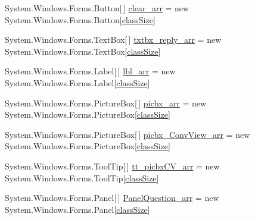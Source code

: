 \begin{DoxyCompactItemize}
\item 
\-System.\-Windows.\-Forms.\-Button\mbox{[}$\,$\mbox{]} \hyperlink{class_sr_p___classroom_inq_1_1frm_classrrom_inq_a1c427c3d5bb61c96ca798e5f6aaff8f4}{clear\-\_\-arr} = new \-System.\-Windows.\-Forms.\-Button\mbox{[}\hyperlink{class_sr_p___classroom_inq_1_1frm_classrrom_inq_a78d9aab335edfe53d39036b9d89928a8}{class\-Size}\mbox{]}
\item 
\-System.\-Windows.\-Forms.\-Text\-Box\mbox{[}$\,$\mbox{]} \hyperlink{class_sr_p___classroom_inq_1_1frm_classrrom_inq_a3411157caafbe33c31a364fafd548afb}{txtbx\-\_\-reply\-\_\-arr} = new \-System.\-Windows.\-Forms.\-Text\-Box\mbox{[}\hyperlink{class_sr_p___classroom_inq_1_1frm_classrrom_inq_a78d9aab335edfe53d39036b9d89928a8}{class\-Size}\mbox{]}
\item 
\-System.\-Windows.\-Forms.\-Label\mbox{[}$\,$\mbox{]} \hyperlink{class_sr_p___classroom_inq_1_1frm_classrrom_inq_a7f0a5f5fff7a87e841b2793f89dcd997}{lbl\-\_\-arr} = new \-System.\-Windows.\-Forms.\-Label\mbox{[}\hyperlink{class_sr_p___classroom_inq_1_1frm_classrrom_inq_a78d9aab335edfe53d39036b9d89928a8}{class\-Size}\mbox{]}
\item 
\-System.\-Windows.\-Forms.\-Picture\-Box\mbox{[}$\,$\mbox{]} \hyperlink{class_sr_p___classroom_inq_1_1frm_classrrom_inq_a067a85853fc3e38cf6343917c4fb061a}{picbx\-\_\-arr} = new \-System.\-Windows.\-Forms.\-Picture\-Box\mbox{[}\hyperlink{class_sr_p___classroom_inq_1_1frm_classrrom_inq_a78d9aab335edfe53d39036b9d89928a8}{class\-Size}\mbox{]}
\item 
\-System.\-Windows.\-Forms.\-Picture\-Box\mbox{[}$\,$\mbox{]} \hyperlink{class_sr_p___classroom_inq_1_1frm_classrrom_inq_a4d179283a68569b1220534d91ddcf6d1}{picbx\-\_\-\-Conv\-View\-\_\-arr} = new \-System.\-Windows.\-Forms.\-Picture\-Box\mbox{[}\hyperlink{class_sr_p___classroom_inq_1_1frm_classrrom_inq_a78d9aab335edfe53d39036b9d89928a8}{class\-Size}\mbox{]}
\item 
\-System.\-Windows.\-Forms.\-Tool\-Tip\mbox{[}$\,$\mbox{]} \hyperlink{class_sr_p___classroom_inq_1_1frm_classrrom_inq_a2b443a71216ac1b9a63f9db496161a4d}{tt\-\_\-picbx\-C\-V\-\_\-arr} = new \-System.\-Windows.\-Forms.\-Tool\-Tip\mbox{[}\hyperlink{class_sr_p___classroom_inq_1_1frm_classrrom_inq_a78d9aab335edfe53d39036b9d89928a8}{class\-Size}\mbox{]}
\item 
\-System.\-Windows.\-Forms.\-Panel\mbox{[}$\,$\mbox{]} \hyperlink{class_sr_p___classroom_inq_1_1frm_classrrom_inq_a5c89025435cd16c638fbc91999b74f80}{\-Panel\-Question\-\_\-arr} = new \-System.\-Windows.\-Forms.\-Panel\mbox{[}\hyperlink{class_sr_p___classroom_inq_1_1frm_classrrom_inq_a78d9aab335edfe53d39036b9d89928a8}{class\-Size}\mbox{]}

\end{DoxyCompactItemize}
